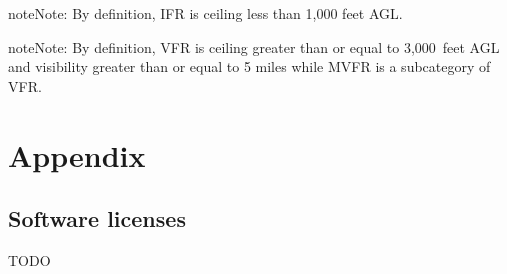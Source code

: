 \documentclass[letterpaper,10pt,english]{sphinxmanual}
\begin{document}
\begin{sphinxadmonition}{note}{Note:}
By definition, IFR is ceiling less than 1,000 feet AGL.
\end{sphinxadmonition}

\begin{sphinxadmonition}{note}{Note:}
By definition, VFR is ceiling greater than or equal to 3,000 feet AGL and visibility greater than or equal to 5 miles while MVFR is a sub\sphinxhyphen{}category of VFR.
\end{sphinxadmonition}

\part{Appendix}


\chapter{Software licenses}
\label{\detokenize{03-appendix/licenses:software-licenses}}\label{\detokenize{03-appendix/licenses::doc}}
TODO



\renewcommand{\indexname}{Index}
\printindex
\end{document}
